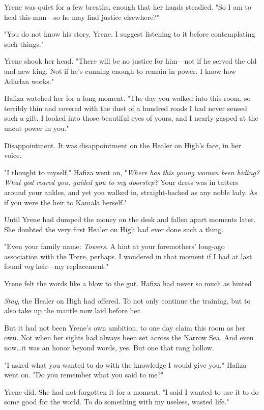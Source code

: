 Yrene was quiet for a few breaths, enough that her hands steadied.
"So I am to heal this man---so he may find justice elsewhere?"

"You do not know his story, Yrene.
I suggest listening to it before contemplating such things."

Yrene shook her head.
"There will be no justice for him---not if he served the old and new king.
Not if he's cunning enough to remain in power.
I know how Adarlan works."

Hafiza watched her for a long moment.
"The day you walked into this room, so terribly thin and covered with the dust of a hundred roads I had never sensed such a gift.
I looked into those beautiful eyes of yours, and I nearly gasped at the uncut power in you."

Disappointment.
It was disappointment on the Healer on High's face, in her voice.

"I thought to myself," Hafiza went on, "\emph{Where has this young woman been hiding?
What god reared you, guided you to my doorstep?} Your dress was in tatters around your ankles, and yet you walked in, straight-backed as any noble lady.
As if you were the heir to Kamala herself."

Until Yrene had dumped the money on the desk and fallen apart moments later.
She doubted the very first Healer on High had ever done such a thing.

"Even your family name: \emph{Towers}.
A hint at your foremothers' long-ago association with the Torre, perhaps.
I wondered in that moment if I had at last found \emph{my} heir---my replacement."

Yrene felt the words like a blow to the gut.
Hafiza had never so much as hinted 

\emph{Stay}, the Healer on High had offered.
To not only continue the training, but to also take up the mantle now laid before her.

But it had not been Yrene's own ambition, to one day claim this room as her own.
Not when her sights had always been set across the Narrow Sea.
And even now\ldots it was an honor beyond words, yes.
But one that rang hollow.

"I asked what you wanted to do with the knowledge I would give you," Hafiza went on.
"Do you remember what you said to me?"

Yrene did.
She had not forgotten it for a moment.
"I said I wanted to use it to do some good for the world.
To do something with my useless, wasted life."


